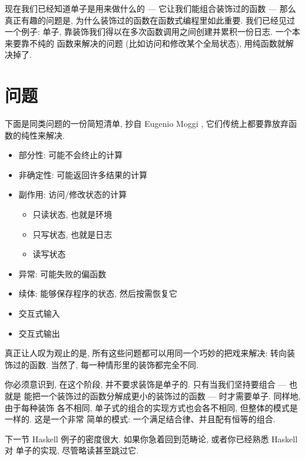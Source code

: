 
\lettrine[lhang=0.17]{现}{在我们已经}知道单子是用来做什么的 --- 它让我们能组合装饰过的函数 ---
那么真正有趣的问题是, 为什么装饰过的函数在函数式编程里如此重要. 我们已经见过一个例子:
 单子, 靠装饰我们得以在多次函数调用之间创建并累积一份日志. 一个本来要靠不纯的
函数来解决的问题 (比如访问和修改某个全局状态), 用纯函数就解决掉了.

\section{问题}

下面是同类问题的一份简短清单, 抄自 Eugenio Moggi
,
它们传统上都要靠放弃函数的纯性来解决.

\begin{itemize}
  \tightlist
  \item
        部分性: 可能不会终止的计算
  \item
        非确定性: 可能返回许多结果的计算
  \item
        副作用: 访问/修改状态的计算

        \begin{itemize}
          \tightlist
          \item
                只读状态, 也就是环境
          \item
                只写状态, 也就是日志
          \item
                读写状态
        \end{itemize}
  \item
        异常: 可能失败的偏函数
  \item
        续体: 能够保存程序的状态, 然后按需恢复它
  \item
        交互式输入
  \item
        交互式输出
\end{itemize}

真正让人叹为观止的是, 所有这些问题都可以用同一个巧妙的把戏来解决: 转向装饰过的函数.
当然了, 每一种情形里的装饰都完全不同.

你必须意识到, 在这个阶段, 并不要求装饰是单子的. 只有当我们坚持要组合 --- 也就是
能把一个装饰过的函数分解成更小的装饰过的函数 --- 时才需要单子. 同样地, 由于每种装饰
各不相同, 单子式的组合的实现方式也会各不相同, 但整体的模式是一样的. 这是一个非常
简单的模式: 一个满足结合律、并且配有恒等的组合.

下一节 Haskell 例子的密度很大. 如果你急着回到范畴论, 或者你已经熟悉 Haskell 对
单子的实现, 尽管略读甚至跳过它.

